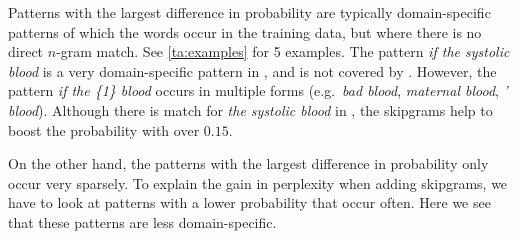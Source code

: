 Patterns with the largest difference in probability are typically domain-specific patterns of which the words occur in the training data, but where there is no direct $n$-gram match. See \cref{ta:examples} for 5 examples. 
The pattern \emph{if the systolic blood} is a very domain-specific pattern in \emea, and is not covered by \obw. However, the pattern \emph{if the \{1\} blood} occurs in multiple forms (e.g.\ \emph{bad blood}, \emph{maternal blood}, \emph{' blood}). Although there is match for \emph{the systolic blood} in \obw, the skipgrams help to boost the probability with over $0.15$. 

On the other hand, the patterns with the largest difference in probability only occur very sparsely. To explain the gain in perplexity when adding skipgrams, we have to look at patterns with a lower probability that occur often. Here we see that these patterns are less domain-specific.
%

